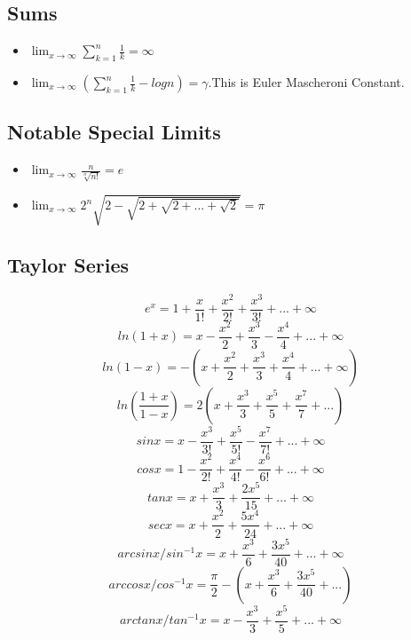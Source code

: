 \documentclass[twocolumn, 10pt]{article}
\begin{document}
\subsection{Sums}
\begin{itemize}
\item $\lim_{x \to \infty} \sum_{k=1}^{n} \frac{1}{k}= 
\infty $
\item $\lim_{x \to \infty} (\sum_{k=1}^{n} \frac{1}{k}-logn)= 
\gamma $.This is Euler Mascheroni Constant.
\end{itemize}
\subsection{Notable Special Limits}
\begin{itemize}
\item $\lim_{x \to \infty} \frac{n}{\sqrt[n]{n!}}=e$
\item $\lim_{x \to \infty} 2^n \sqrt{2- \sqrt{2 + \sqrt{2 +...+ \sqrt{2}}}}= \pi $
\end{itemize}
\subsection{Taylor Series}
$$e^x = 1 + \frac{x}{1!}+ \frac{x^{2}}{2!}+ \frac{x^{3}}{3!}+...+ \infty$$
$$ln(1+x) = x - \frac{x^{2}}{2}+ \frac{x^{3}}{3}- \frac{x^{4}}{4}+...+ \infty$$
$$ln(1-x) = -(x + \frac{x^{2}}{2}+ \frac{x^{3}}{3}+ \frac{x^{4}}{4}+...+ \infty)$$
$$ln(\frac{1+x}{1-x}) = 2(x+ \frac{x^{3}}{3}+ \frac{x^{5}}{5}+ \frac{x^{7}}{7}+...)$$
$$sinx = x - \frac{x^{3}}{3!}+ \frac{x^{5}}{5!}- \frac{x^{7}}{7!}+...+ \infty$$
$$cosx = 1 - \frac{x^{2}}{2!}+ \frac{x^{4}}{4!}- \frac{x^{6}}{6!}+...+ \infty$$
$$tanx = x + \frac{x^{3}}{3}+ \frac{2x^{5}}{15}+...+ \infty$$
$$secx = x + \frac{x^{2}}{2}+ \frac{5x^{4}}{24}+...+ \infty$$
$$arcsinx/sin^{-1}x = x + \frac{x^{3}}{6}+ \frac{3x^{5}}{40}+...+ \infty$$
$$arccosx/cos^{-1}x = \frac{\pi}{2}- (x + \frac{x^{3}}{6}+ \frac{3x^{5}}{40}+...)$$
$$arctanx/tan^{-1}x = x - \frac{x^{3}}{3}+ \frac{x^{5}}{5}+...+ \infty$$
\end{document}
